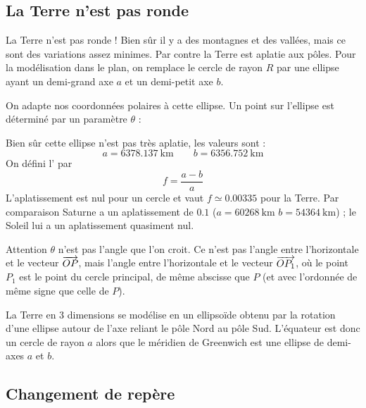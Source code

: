 \documentclass[class=report,crop=false]{standalone}
\begin{document}
\subsection{La Terre n'est pas ronde}

La Terre n'est pas ronde ! Bien sûr il y a des montagnes et des vallées, mais ce sont 
des variations assez minimes.
Par contre la Terre est aplatie aux pôles.
Pour la modélisation dans le plan, on remplace le cercle de rayon $R$ 
par une ellipse ayant un demi-grand axe $a$ et un demi-petit axe $b$.


On adapte nos coordonnées polaires à cette ellipse. Un point sur l'ellipse est déterminé
par un paramètre $\theta$ :

Bien sûr cette ellipse n'est pas très aplatie, les valeurs sont :
$$a = \SI{6378.137}{\kilo\meter} \qquad b = \SI{6356.752}{\kilo\meter}$$
On défini l' par 
$$f = \frac{a-b}{a}$$
L'aplatissement est nul pour un cercle et vaut $f \simeq \num{0.00335}$ pour la Terre.
Par comparaison Saturne a un aplatissement de $\num{0.1}$
($a= \SI{60268}{\kilo\meter}$ $b=\SI{54364}{\kilo\meter}$) ; le Soleil lui a un aplatissement quasiment nul.



Attention $\theta$ n'est pas l'angle que l'on croit. Ce n'est pas l'angle entre l'horizontale
et le vecteur $\overrightarrow{OP}$, mais l'angle entre l'horizontale et le vecteur 
$\overrightarrow{OP_1}$, où le point $P_1$ est le point du cercle principal, de même abscisse que $P$
(et avec l'ordonnée de même signe que celle de $P$).


La Terre en $3$ dimensions se modélise en un ellipsoïde obtenu 
par la rotation d'une ellipse autour de l'axe reliant le pôle Nord au pôle Sud.
L'équateur est donc un cercle de rayon $a$ alors que le méridien de Greenwich
est une ellipse de demi-axes $a$ et $b$.


\subsection{Changement de repère}
\end{document}
